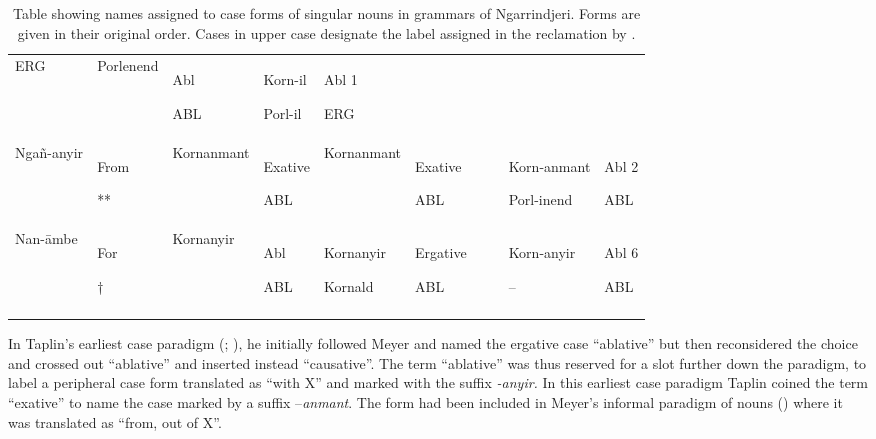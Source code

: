 \begin{sidewaystable}
\begin{tabularx}{\textwidth}{QQQQQQQQQQ}
ERG & Porlenend & Abl

ABL & Korn-il

Porl-il & Abl 1

ERG\\
Ngañ-anyir & From

** & Kornanmant & Exative

ABL & Kornanmant & Exative

ABL &  &  & Korn-anmant

Porl-inend & Abl 2

ABL\\
Nan-āmbe & For

† & Kornanyir & Abl

ABL & Kornanyir

Kornald & Ergative

ABL &  &  & Korn-anyir

– & Abl 6

ABL\\
\lspbottomrule
\end{tabularx}
\caption{\label{bkm:Ref329599964}\label{tab:key:83} Table showing names assigned to case forms of singular nouns in grammars of Ngarrindjeri. Forms are given in their original order. Cases in upper case designate the label assigned in the reclamation by \citet[95--96]{horgen_languages_2004}.}
\end{sidewaystable}


\hspace*{-1.4pt}In Taplin’s earliest case paradigm (\citeyear{taplin_vocabulary_1867}; ), he initially followed Meyer and named the ergative case “ablative” but then reconsidered the choice and crossed out “ablative” and inserted instead “causative''. The term “ablative” was thus reserved for a slot further down the paradigm, to label a peripheral case form translated as “with X” and marked with the suffix \textit{{}-anyir.} In this earliest case paradigm Taplin coined the term “exative” to name the case marked by a suffix –\textit{anmant}. The form had been included in Meyer’s informal paradigm of nouns () where it was translated as “from, out of X''.

